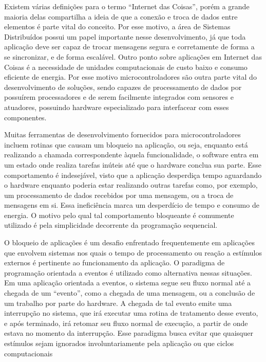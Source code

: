 \documentclass[11pt]{article}
\begin{document}
\tab Existem várias definições para o termo “Internet das
Coisas”, porém a grande maioria delas compartilha a ideia de que a conexão e troca de dados
entre elementos é parte vital do conceito. Por esse motivo, a área de Sistemas Distribuídos possui um
papel importante nesse desenvolvimento, já que toda aplicação deve ser capaz de trocar
mensagens segura e corretamente de forma a se sincronizar, e de forma escalável.\cite{singh2014}\cite{wortmann2015}\cite{chui2010}
Outro ponto sobre aplicações em Internet das Coisas é a necessidade de unidades
computacionais de custo baixo e consumo eficiente de energia. Por esse motivo microcontroladores
são outra parte vital do desenvolvimento de soluções, sendo capazes de processamento de dados por possuírem processadores e de
serem facilmente integrados com sensores e atuadores, possuindo hardware especializado para
interfacear com esses componentes.\cite{edwards1997}
\par Muitas ferramentas de desenvolvimento fornecidos para microcontroladores incluem rotinas que causam um bloqueio na
aplicação, ou seja, enquanto está realizando a chamada correspondente àquela funcionalidade, o
software entra em um estado onde realiza tarefas inúteis até que o hardware conclua sua
parte. Esse comportamento é indesejável, visto que a aplicação desperdiça tempo aguardando o
hardware enquanto poderia estar realizando outras tarefas como, por exemplo, um processamento de
dados recebidos por uma mensagem, ou a troca de mensagens em si. Essa ineficiência marca um
desperdício de tempo e consumo de energia. O motivo pelo qual tal comportamento bloqueante é comumente utilizado é pela simplicidade decorrente da programação sequencial.
\par O bloqueio de aplicações é um desafio enfrentado frequentemente em aplicações que envolvem
sistemas nos quais o tempo de processamento ou reação a estímulos externos é pertinente ao
funcionamento da aplicação. O paradigma de programação orientada a eventos é utilizado como alternativa nessas situações. Em uma aplicação orientada a eventos, o sistema segue
seu fluxo normal até a chegada de um “evento”, como a chegada de uma mensagem, ou a conclusão
de um trabalho por parte do hardware. A chegada de tal evento emite uma interrupção no sistema, que
irá executar uma rotina de tratamento desse evento, e após terminado, irá retomar seu fluxo normal
de execução, a partir de onde estava no momento da interrupção. Esse paradigma busca evitar que
quaisquer estímulos sejam ignorados involuntariamente pela aplicação ou que ciclos computacionais
\end{document}
